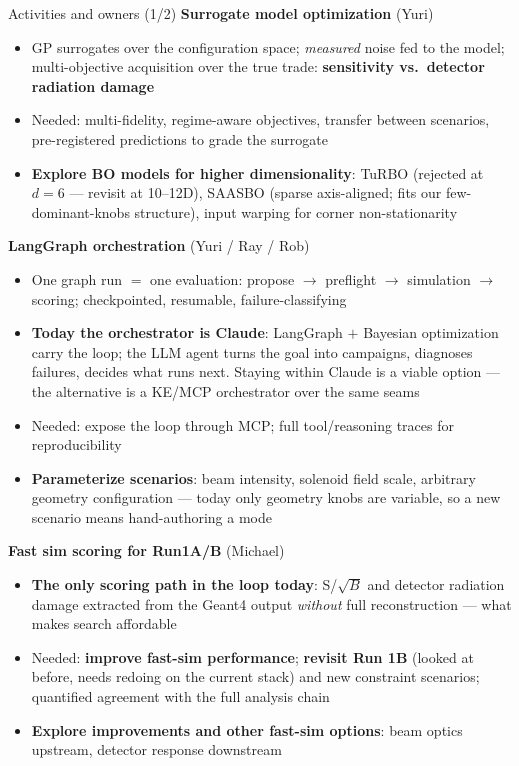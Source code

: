 \documentclass[aspectratio=169,10pt]{beamer}
\begin{document}
\begin{frame}{Activities and owners (1/2)}
\footnotesize
\textbf{Surrogate model optimization} \hfill \textcolor{fnalblue}{(Yuri)}
\begin{itemize}\tiny
  \item GP surrogates over the configuration space; \emph{measured} noise fed to the model; multi-objective acquisition over the true trade: \textbf{sensitivity vs.\ detector radiation damage}
  \item Needed: multi-fidelity, regime-aware objectives, transfer between scenarios, pre-registered predictions to grade the surrogate
  \item \textbf{Explore BO models for higher dimensionality}: TuRBO (rejected at $d{=}6$ --- revisit at 10--12D), SAASBO (sparse axis-aligned; fits our few-dominant-knobs structure), input warping for corner non-stationarity
\end{itemize}
\vspace{0.15em}

\textbf{LangGraph orchestration} \hfill \textcolor{fnalblue}{(Yuri / Ray / Rob)}
\begin{itemize}\tiny
  \item One graph run $=$ one evaluation: propose $\rightarrow$ preflight $\rightarrow$ simulation $\rightarrow$ scoring; checkpointed, resumable, failure-classifying
  \item \textbf{Today the orchestrator is Claude}: LangGraph $+$ Bayesian optimization carry the loop; the LLM agent turns the goal into campaigns, diagnoses failures, decides what runs next. Staying within Claude is a viable option --- the alternative is a KE/MCP orchestrator over the same seams
  \item Needed: expose the loop through MCP; full tool/reasoning traces for reproducibility
  \item \textbf{Parameterize scenarios}: beam intensity, solenoid field scale, arbitrary geometry configuration --- today only geometry knobs are variable, so a new scenario means hand-authoring a mode
\end{itemize}
\vspace{0.15em}

\textbf{Fast sim scoring for Run1A/B} \hfill \textcolor{fnalblue}{(Michael)}
\begin{itemize}\tiny
  \item \textbf{The only scoring path in the loop today}: S/$\sqrt{B}$ and detector radiation damage extracted from the Geant4 output \emph{without} full reconstruction --- what makes search affordable
  \item Needed: \textbf{improve fast-sim performance}; \textbf{revisit Run 1B} (looked at before, needs redoing on the current stack) and new constraint scenarios; quantified agreement with the full analysis chain
  \item \textbf{Explore improvements and other fast-sim options}: beam optics upstream, detector response downstream
\end{itemize}
\end{frame}
\end{document}
